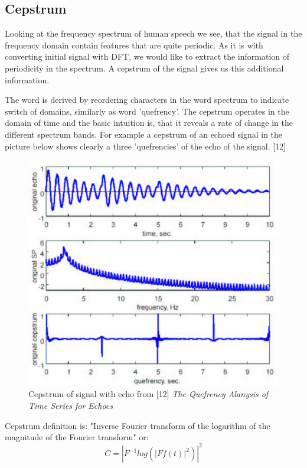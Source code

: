 \documentclass[12pt,a4paper,english]{article}
\begin{document}
\newpage
\subsection{Cepstrum}

Looking at the frequency spectrum of human speech we see, that  the signal in the frequency domain contain features that are quite periodic. As it is with converting initial signal with DFT, we would like to extract the information of periodicity in the spectrum. 
A cepstrum of the signal gives us this additional information. \newline

The word is derived by reordering characters in the word spectrum to indicate switch of domains, similarly as word 'quefrency'. The cepstrum operates in the domain of time and the basic intuition is, that it reveals a rate of change in the different spectrum bands. 
For example a cepstrum of an echoed signal in the picture below shows clearly a three 'quefrencies' of the echo of the signal. [12]
\begin{figure}[hb]
    \centering
    \includegraphics[scale=0.4]{echo_cepstrum.jpg}
    \caption[]{Cepstrum of signal with echo from [12] \emph{The Quefrency Alanysis of Time Series for Echoes}}
\end{figure}


Cepstrum definition is: "Inverse Fourier transform of the logarithm of the magnitude of the Fourier transform" or:
\begin{equation}
    C=|F^{-1}{log(|F{f(t)}|^2)}|^2
\end{equation}
\end{document}

